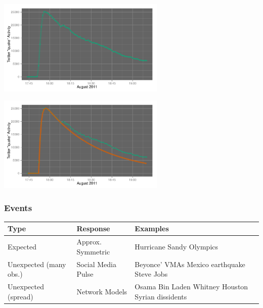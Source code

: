 \documentclass{beamer}
\begin{document}
\begin{frame}
  \begin{center}
    \includegraphics[width=8cm]{./imgs/va_quake.pdf}
  \end{center}
\end{frame}

\begin{frame}
  \begin{center}
    \includegraphics[width=8cm]{./imgs/va_quake_fit1.pdf}
  \end{center}
\end{frame}


\begin{frame}\frametitle{Events}
\begin{table}
\begin{tabular}{ m{2cm} | m{ 2.5cm} | m{4cm}}
\hline
Type & Response & Examples \\ \hline
Expected    & Approx. \newline Symmetric & Hurricane Sandy \newline Olympics \\ \hline
Unexpected (many obs.) & Social Media \newline Pulse & Beyonce' VMAs \newline  Mexico earthquake \newline  Steve Jobs \\ \hline
Unexpected (spread) & Network \newline Models & Osama Bin Laden \newline  Whitney Houston \newline  Syrian dissidents \\ \hline
\end{tabular}
\end{table}
\end{frame}
\end{document}
